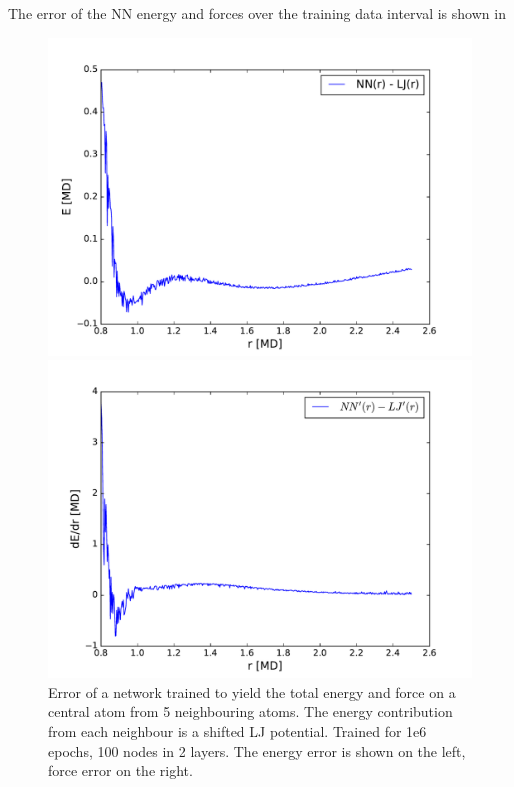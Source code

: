 \documentclass[twoside,english]{uiofysmaster}
\begin{document}
The error of the NN energy and forces over the training data interval is shown in 
\begin{figure}
\begin{minipage}[t]{0.48\linewidth}
  \includegraphics[width=\textwidth]{Figures/Tests/manyNeighbourEnergyError.pdf}
\end{minipage}
\quad
\begin{minipage}[t]{0.48\linewidth}
\includegraphics[width=\textwidth]{Figures/Tests/manyNeighbourForceError.pdf}
\end{minipage}
  \caption{Error of a network trained to yield the total energy and force on a central atom from 5 neighbouring atoms. 
           The energy contribution from each neighbour is a shifted LJ potential. Trained for 1e6 epochs, 100 nodes
           in 2 layers. The energy error is shown on the left, force error on the right.}
\label{fig:errorManyNeighbourNN}
\end{figure}
\end{document}
